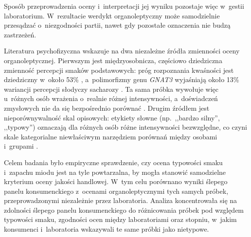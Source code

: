 Sposób przeprowadzenia oceny i~interpretacji jej wyniku pozostaje więc
w~gestii laboratorium. W~rezultacie werdykt organoleptyczny może samodzielnie
przesądzać o~niezgodności partii, nawet gdy pozostałe oznaczenia nie budzą
zastrzeżeń.


Literatura psychofizyczna wskazuje na dwa niezależne źródła zmienności 
oceny organoleptycznej. Pierwszym jest międzyosobnicza, częściowo dziedziczna zmienność
percepcji smaków podstawowych: próg rozpoznania kwaśności jest dziedziczny
w~około 53\% \cite{wise2007twin}, a~polimorfizmy genu \textit{GNAT3}
wyjaśniają około 13\% wariancji percepcji słodyczy sacharozy
\cite{fushan2010sweet}. Ta sama próbka wywołuje więc u~różnych osób wrażenia
o~realnie różnej intensywności, a~doświadczeń zmysłowych nie da się
bezpośrednio porównać \cite{bartoshuk2000comparing}. Drugim źródłem jest
nieporównywalność skal opisowych: etykiety słowne (np.\ ,,bardzo silny'',
,,typowy'') oznaczają dla różnych osób różne intensywności bezwzględne,
co czyni skale kategorialne niewłaściwym narzędziem porównań między osobami
i~grupami \cite{bartoshuk2003labeled}.

Celem badania było empiryczne sprawdzenie, czy ocena typowości smaku i~zapachu
miodu jest na tyle powtarzalna, by mogła stanowić samodzielne kryterium
oceny jakości handlowej.
W~tym celu porównano wyniki ślepego panelu konsumenckiego z~ocenami 
organoleptycznymi tych samych próbek, przeprowadzonymi niezależnie 
przez laboratoria. Analiza koncentrowała się na zdolności ślepego panelu konsumenckiego do różnicowania próbek pod względem typowości smaku, zgodności ocen między laboratoriami oraz stopniu, w~jakim konsumenci i~laboratoria wskazywali te same próbki jako nietypowe.
